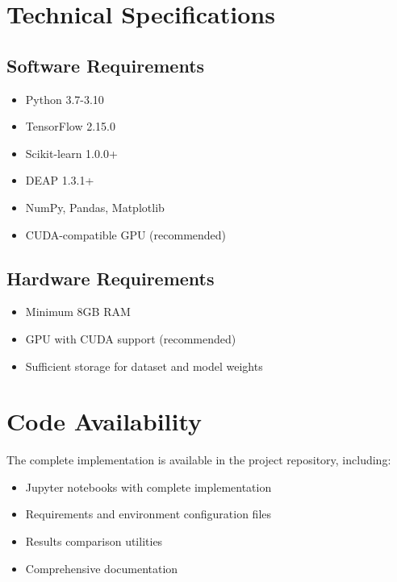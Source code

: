 \documentclass[journal]{IEEEtran}
\begin{document}
\appendices

\section{Technical Specifications}  

\subsection{Software Requirements}
\begin{itemize}
    \item Python 3.7-3.10
    \item TensorFlow 2.15.0
    \item Scikit-learn 1.0.0+
    \item DEAP 1.3.1+
    \item NumPy, Pandas, Matplotlib
    \item CUDA-compatible GPU (recommended)
\end{itemize}

\subsection{Hardware Requirements}
\begin{itemize}
    \item Minimum 8GB RAM
    \item GPU with CUDA support (recommended)
    \item Sufficient storage for dataset and model weights
\end{itemize}

\section{Code Availability}

The complete implementation is available in the project repository, including:
\begin{itemize}
    \item Jupyter notebooks with complete implementation
    \item Requirements and environment configuration files
    \item Results comparison utilities
    \item Comprehensive documentation
\end{itemize}
\end{document}
